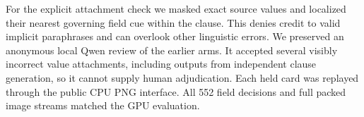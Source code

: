 For the explicit attachment check we masked exact source values and localized their nearest governing field cue within the clause. This denies credit to valid implicit paraphrases and can overlook other linguistic errors. We preserved an anonymous local Qwen review of the earlier arms. It accepted several visibly incorrect value attachments, including outputs from independent clause generation, so it cannot supply human adjudication. Each held card was replayed through the public CPU PNG interface. All 552 field decisions and full packed image streams matched the GPU evaluation.
